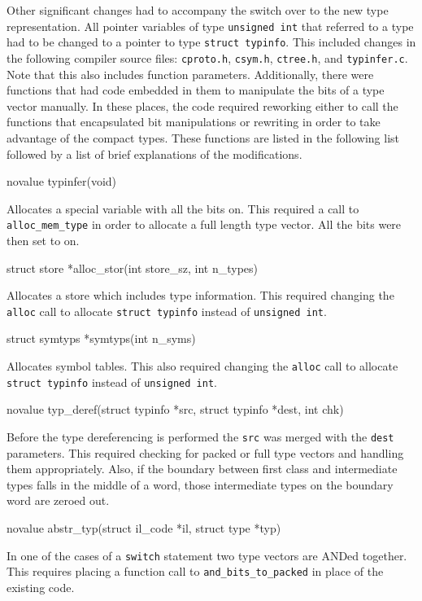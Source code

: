 Other significant changes had to accompany the switch over to the new
type representation. All pointer variables of type \texttt{unsigned
int} that referred to a type had to be changed to a pointer to type
\texttt{struct typinfo}. This included changes in the following
compiler source files: \texttt{cproto.h}, \texttt{csym.h},
\texttt{ctree.h}, and \texttt{typinfer.c}. Note that this also
includes function parameters. Additionally, there were functions that
had code embedded in them to manipulate the bits of a type vector
manually. In these places, the code required reworking either to
call the functions that encapsulated bit manipulations or rewriting in
order to take advantage of the compact types. These functions are
listed in the following list followed by a list of brief explanations
of the modifications.

{\ttfamily\mdseries
novalue typinfer(void)}

Allocates a special variable with all the bits on. This required a
call to \texttt{alloc\_mem\_type} in order to allocate a full length
type vector. All the bits were then set to on.

{\ttfamily\mdseries
struct store *alloc\_stor(int store\_sz, int n\_types)}

Allocates a store which includes type information. This required changing the \texttt{alloc} call to allocate
\texttt{struct typinfo} instead of \texttt{unsigned int}.

{\ttfamily\mdseries
struct symtyps *symtyps(int n\_syms)}


Allocates symbol tables. This also required changing the
\texttt{alloc} call to allocate \texttt{struct typinfo} instead of
\texttt{unsigned int}.

{\ttfamily\mdseries
novalue typ\_deref(struct typinfo *src, struct typinfo *dest, int chk)}


Before the type dereferencing is performed the \texttt{src} was merged
with the \texttt{dest} parameters. This required checking for packed
or full type vectors and handling them appropriately. Also, if the
boundary between first class and intermediate types falls in the
middle of a word, those intermediate types on the boundary word are
zeroed out.

{\ttfamily\mdseries
novalue abstr\_typ(struct il\_code *il, struct type *typ)}


In one of the cases of a \texttt{switch} statement two type vectors
are ANDed together. This requires placing a function call to
\texttt{and\_bits\_to\_packed} in place of the existing code.

